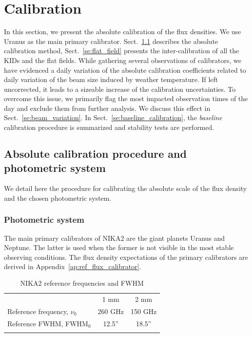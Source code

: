\documentclass[traditionalabstract]{aa}
\begin{document}
\section{Calibration}
\label{se:calibration}
%

In this section, we present the absolute calibration of the flux densities. We
use Uranus as the main primary calibrator. Sect.~\ref{se:calibration_method}
describes the absolute calibration method, Sect.~\ref{se:flat_field} presents
the inter-calibration of all the KIDs and the flat fields. While
gathering several observations of calibrators, we have evidenced a
daily variation of the absolute calibration
coefficients related to daily variation of the beam
size induced by weather temperature. If left uncorrected, it leads to
a sizeable increase of the calibration uncertainties. To
overcome this issue, we primarily flag the most impacted observation
times of the day and exclude them from further analysis.
We discuss this effect in
Sect.~\ref{se:beam_variation}. In Sect.~\ref{se:baseline_calibration},
the \emph{baseline} calibration procedure is summarized and stability
tests are performed.  



\subsection{Absolute calibration procedure and photometric system}
\label{se:calibration_method}

We detail here the procedure for calibrating the absolute scale of
the flux density and the chosen photometric system.

\subsubsection{Photometric system}
\label{se:photometric_system}

The main primary calibrators of NIKA2 are the giant planets Uranus and
Neptune. The latter is used when the former is not visible in the most
stable observing conditions. The flux density expectations of the
primary calibrators are derived in Appendix~\ref{ap:ref_flux_calibrator}. 
%
\begin{table}[!htbp]
\caption{NIKA2 reference frequencies and FWHM}
\label{tab:definitions}
\centering     
\begin{tabular}{lcc}
\hline\hline
      \noalign{\smallskip}
      & 1 mm & 2 mm \\
      \noalign{\smallskip}
      \hline
      \noalign{\smallskip}
      Reference frequency, $\nu_{0}$ & 260 GHz & 150 GHz \\
      Reference FWHM,  FWHM$_{0}$    & 12.5'' & 18.5'' \\
      \noalign{\smallskip}
      \hline
\end{tabular}
\end{table}
\end{document}
